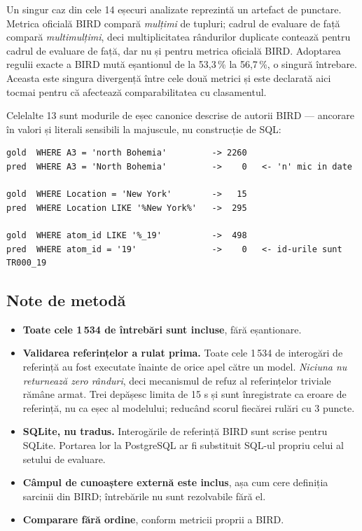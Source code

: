 \documentclass[12pt,a4paper]{report}
\begin{document}
Un singur caz din cele 14 eșecuri analizate reprezintă un artefact de punctare. Metrica oficială BIRD
compară \emph{mulțimi} de tupluri; cadrul de evaluare de față compară
\emph{multimulțimi}, deci multiplicitatea rândurilor duplicate contează
pentru cadrul de evaluare de față, dar nu și pentru metrica oficială BIRD. Adoptarea regulii exacte a BIRD mută eșantionul de la
53,3\,\% la 56,7\,\%, o singură întrebare. Aceasta este singura divergență
între cele două metrici și este declarată aici tocmai pentru că afectează
comparabilitatea cu clasamentul.

Celelalte 13 sunt modurile de eșec canonice descrise de autorii BIRD ---
ancorare în valori și literali sensibili la majuscule, nu construcție de SQL:

\begin{lstlisting}[caption={Trei eșecuri reprezentative, cu numărul de rânduri
returnate de fiecare interogare.},captionpos=b]
gold  WHERE A3 = 'north Bohemia'         -> 2260
pred  WHERE A3 = 'North Bohemia'         ->    0   <- 'n' mic in date

gold  WHERE Location = 'New York'        ->   15
pred  WHERE Location LIKE '%New York%'   ->  295

gold  WHERE atom_id LIKE '%_19'          ->  498
pred  WHERE atom_id = '19'               ->    0   <- id-urile sunt TR000_19
\end{lstlisting}

\subsection{Note de metodă}

\begin{itemize}[nosep,leftmargin=*]
  \item \textbf{Toate cele 1\,534 de întrebări sunt incluse}, fără
    eșantionare.
  \item \textbf{Validarea referințelor a rulat prima.} Toate cele 1\,534 de
    interogări de referință au fost executate înainte de orice apel către un
    model. \emph{Niciuna nu returnează zero rânduri}, deci mecanismul de
    refuz al referințelor triviale rămâne armat. Trei depășesc limita de 15 s
    și sunt înregistrate ca eroare de referință, nu ca eșec al modelului;
    reducând scorul fiecărei rulări cu 3 puncte.
  \item \textbf{SQLite, nu tradus.} Interogările de referință BIRD sunt
    scrise pentru SQLite. Portarea lor la PostgreSQL ar fi substituit SQL-ul
    propriu celui al setului de evaluare.
  \item \textbf{Câmpul de cunoaștere externă este inclus}, așa cum cere
    definiția sarcinii din BIRD; întrebările nu sunt rezolvabile fără el.
  \item \textbf{Comparare fără ordine}, conform metricii proprii a BIRD.
\end{itemize}
\end{document}
